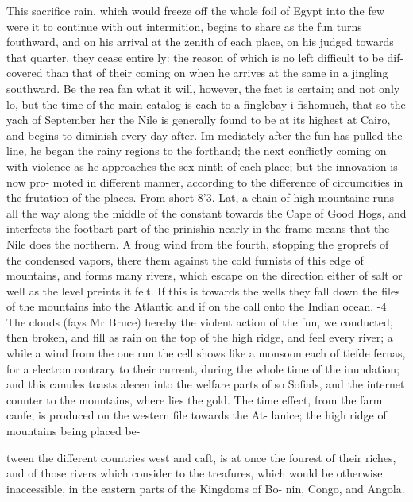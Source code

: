 \documentclass{article}
\begin{document}
This sacrifice rain, which would freeze off the whole foil of Egypt into the few were it to continue with out intermition, begins to share as the fun turns fouthward, and on his arrival at the zenith of each place, on his judged towards that quarter, they cease entire ly: the reason of which is no left difficult to be dif- covered than that of their coming on when he arrives at the same in a jingling southward. Be the rea fan what it will, however, the fact is certain; and not only lo, but the time of the main catalog is each to a finglebay i fishomuch, that so the yach of September her the Nile is generally found to be at its highest at Cairo, and begins to diminish every day after. Im-mediately after the fun has pulled the line, he began the rainy regions to the forthand; the next conflictly coming on with violence as he approaches the sex ninth of each place; but the innovation is now pro- moted in different manner, according to the difference of circumcities in the frutation of the places. From short 8’3. Lat, a chain of high mountaine runs all the way along the middle of the constant towards the Cape of Good Hogs, and interfects the footbart part of the prinishia nearly in the frame means that the Nile does the northern. A froug wind from the fourth, stopping the groprefs of the condensed vapors, there them against the cold furnists of this edge of mountains, and forms many rivers, which escape on the direction either of salt or well as the level preints it felt. If this is towards the wells they fall down the files of the mountains into the Atlantic and if on the call onto the Indian ocean. -4 The clouds (fays Mr Bruce) hereby the violent action of the fun, we conducted, then broken, and fill as rain on the top of the high ridge, and feel every river; a while a wind from the one run the cell shows like a monsoon each of tiefde fernas, for a electron contrary to their current, during the whole time of the inundation; and this canules toasts alecen into the welfare parts of so Sofials, and the internet counter to the mountains, where lies the gold. The time effect, from the farm caufe, is produced on the western file towards the At- lanice; the high ridge of mountains being placed be-

tween the different countries west and caft, is at once the fourest of their riches, and of those rivers which consider to the treafures, which would be otherwise inaccessible, in the eastern parts of the Kingdoms of Bo- nin, Congo, and Angola.
\end{document}
